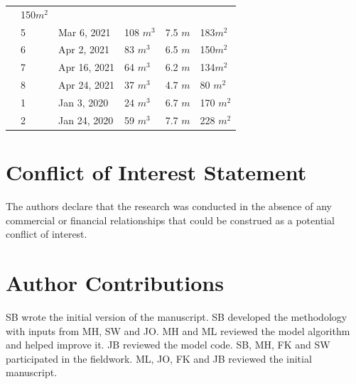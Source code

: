 \documentclass[utf8]{frontiersSCNS} %
\begin{document}
\begin{table}
\begin{tabular}{@{}|llllll|@{}}
		                       & 150$m^{2}$                                                                       \\
		\multicolumn{1}{|l|}{} & 5            & Mar 6, 2021   & 108 $m^{3}$     & 7.5 $m$
		                       & 183$m^{2}$                                                                       \\
		\multicolumn{1}{|l|}{} & 6            & Apr 2, 2021   & 83 $m^{3}$      & 6.5 $m$
		                       & 150$m^{2}$                                                                       \\
		\multicolumn{1}{|l|}{} & 7            & Apr 16, 2021  & 64 $m^{3}$      & 6.2 $m$
		                       & 134$m^{2}$                                                                       \\
		\multicolumn{1}{|l|}{} & 8            & Apr 24, 2021  & 37 $m^{3}$      & 4.7 $m$
		                       & 80 $m^{2}$                                                                       \\
		\midrule
		\multicolumn{1}{|l|}{\multirow{2}{*}{\rotatebox[origin=c]{90}{CH20}}}
		                       & 1            & Jan 3, 2020   & 24 $m^{3}$      & 6.7 $m$
		                       & 170 $m^{2}$                                                                      \\
		\multicolumn{1}{|l|}{} & 2            & Jan 24, 2020  & 59 $m^{3}$      & 7.7 $m$
		                       & 228 $m^{2}$                                                                      \\
		\midrule
	\end{tabular}

\end{table}


\section*{Conflict of Interest Statement} The authors declare that the research was conducted in the absence of any
commercial or financial relationships that could be construed as a potential conflict of interest.

\section*{Author Contributions} SB wrote the initial version of the manuscript. SB developed the methodology with
inputs from MH, SW and JO. MH and ML reviewed the model algorithm and helped improve it. JB reviewed the model
code. SB, MH, FK and SW participated in the fieldwork. ML, JO, FK and JB reviewed the initial manuscript.
\end{document}
